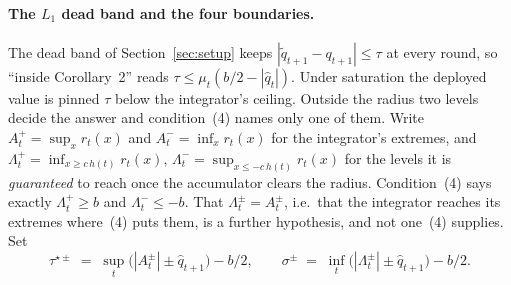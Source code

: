 \paragraph{The $L_1$ dead band and the four boundaries.} The dead band of
Section~\ref{sec:setup} keeps $|\tilde{q}_{t+1}-q_{t+1}| \le \tau$ at every round, so ``inside
Corollary~2'' reads
$\tau \le \mu_t(b/2-|\hat{q}_t|)$. Under saturation the deployed value is pinned $\tau$ below the
integrator's ceiling. Outside the radius two levels decide the answer and condition~(4) names only one of them.
Write $A^{+}_t = \sup_x r_t(x)$ and $A^{-}_t = \inf_x r_t(x)$ for the integrator's extremes, and
$\Lambda^{+}_t = \inf_{x \ge c\,h(t)} r_t(x)$, $\Lambda^{-}_t = \sup_{x \le -c\,h(t)} r_t(x)$ for
the levels it is \emph{guaranteed} to reach once the accumulator clears the radius.
Condition~(4) says exactly $\Lambda^{+}_t \ge b$ and $\Lambda^{-}_t \le -b$. That
$\Lambda^{\pm}_t = A^{\pm}_t$, i.e.\ that the integrator reaches its extremes where~(4) puts
them, is a further hypothesis, and not one~(4) supplies. Set
\begin{equation}
  \tau^{\star\pm} \;=\; \sup_t\big(|A^{\pm}_t| \pm \hat{q}_{t+1}\big) - b/2,
  \qquad
  \sigma^{\pm} \;=\; \inf_t\big(|\Lambda^{\pm}_t| \pm \hat{q}_{t+1}\big) - b/2 .
  \label{eq:boundaries}
\end{equation}

